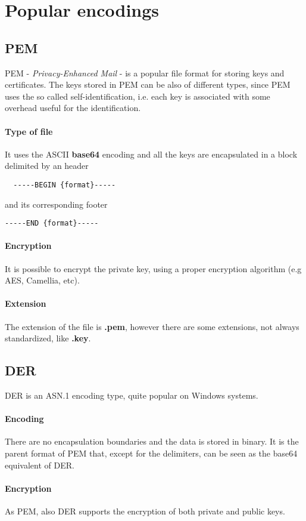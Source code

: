 \documentclass[11 pt]{article}
\begin{document}
\section{Popular encodings}

\subsection{PEM}
PEM - \textit{Privacy-Enhanced Mail} - is a popular file format for storing keys and certificates. The keys stored in PEM can be also of different types, since PEM uses the so called self-identification, i.e. each key is associated with some overhead useful for the identification.
\paragraph*{Type of file}
It uses the ASCII \textbf{base64} encoding and all the keys are encapsulated in a block delimited by an header
\begin{verbatim}
  -----BEGIN {format}-----
\end{verbatim}
and its corresponding footer
\begin{verbatim}
-----END {format}-----
\end{verbatim}
\paragraph*{Encryption}
It is possible to encrypt the private key, using a proper encryption algorithm (e.g AES, Camellia, etc). 
\paragraph*{Extension}
The extension of the file is \textbf{.pem}, however there are some extensions, not always standardized, like \textbf{.key}.

\subsection{DER}
DER is an ASN.1 encoding type, quite popular on Windows systems.
\paragraph*{Encoding}
There are no encapsulation boundaries and the data is stored in binary. It is the parent format of PEM that, except for the delimiters, can be seen as the base64 equivalent of DER.
\paragraph*{Encryption}
As PEM, also DER supports the encryption of both private and public keys.
\end{document}
